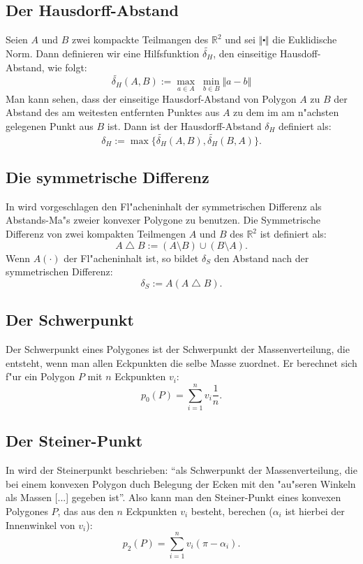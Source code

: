 \documentclass[a4paper,10pt,twoside]{scrreprt}
\begin{document}
\subsection{Der Hausdorff-Abstand}

Seien $A$ und $B$ zwei kompackte Teilmangen des $\mathbb{R}^2$ und sei $\Vert\centerdot\Vert$ die Euklidische Norm.
Dann definieren wir eine Hilfsfunktion $ \widetilde{\delta_H}  $, den einseitige Hausdoff-Abstand, wie folgt:
\[ \widetilde{\delta_H}(A,B):=\max_{a\in A} \;\min_{b\in B} \Vert a-b \Vert\]
Man kann sehen, dass der einseitige Hausdorf-Abstand von Polygon $A$ zu $B$ der Abstand des am weitesten entfernten Punktes aus $A$ zu dem im am n"achsten gelegenen Punkt aus $B$ ist. Dann ist der Hausdorff-Abstand $\delta_H$ definiert als:
\[\delta_H:=\max\{\widetilde{\delta_H}(A,B),\widetilde{\delta_H}(B,A)\}.\]


\subsection{Die symmetrische Differenz}

In \cite{AFRW} wird vorgeschlagen den Fl"acheninhalt der symmetrischen Differenz als Abstands-Ma"s zweier konvexer Polygone zu benutzen. Die Symmetrische Differenz von zwei kompakten Teilmengen $A$ und $B$ des $\mathbb{R}^2 $ ist definiert als:
\[A\bigtriangleup B:=(A\setminus B)\cup(B\setminus A).\]
Wenn $A(\cdot)$ der Fl"acheninhalt ist, so bildet $\delta_S$ den Abstand nach der symmetrischen Differenz:
\[\delta_S:=A(A \bigtriangleup B).\]

\subsection{Der Schwerpunkt}

Der Schwerpunkt eines Polygones ist der Schwerpunkt der Massenverteilung, die entsteht, wenn man allen Eckpunkten die selbe Masse zuordnet. Er berechnet sich f"ur ein Polygon $P$ mit $n$ Eckpunkten $v_i$:
\[p_0(P)=\sum^n_{i=1}v_i \frac{1}{n}.\]

\subsection{Der Steiner-Punkt}

In \cite{Sch} wird der Steinerpunkt beschrieben: "`als Schwerpunkt der Massenverteilung, die bei einem konvexen Polygon duch Belegung der Ecken mit den "au"seren Winkeln als Massen [...] gegeben ist"'. Also kann man den Steiner-Punkt eines konvexen Polygones $P$, das aus den $n$ Eckpunkten $v_i$ besteht, berechen ($\alpha_i$ ist hierbei der Innenwinkel von $v_i$):
\[p_2(P)=\sum^n_{i=1}v_i (\pi-\alpha_i).\]
\end{document}

